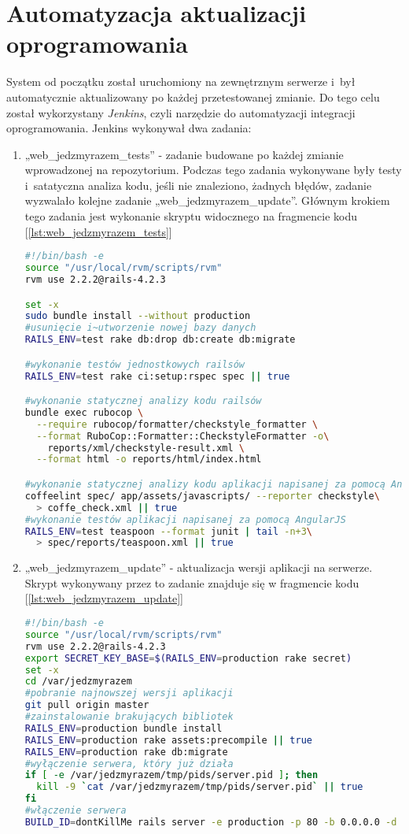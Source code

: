 \documentclass[eng,archivemode]{mgr}
\begin{document}
\section{Automatyzacja aktualizacji oprogramowania}
System od początku został uruchomiony na zewnętrznym serwerze i~był automatycznie aktualizowany po każdej przetestowanej zmianie. Do tego celu został wykorzystany \textit{Jenkins}, czyli narzędzie do automatyzacji integracji oprogramowania. Jenkins wykonywał dwa zadania:
\begin{enumerate}
	\item „web\_jedzmyrazem\_tests” - zadanie budowane po każdej zmianie wprowadzonej na repozytorium. Podczas tego zadania wykonywane były testy i~satatyczna analiza kodu, jeśli nie znaleziono, żadnych błędów, zadanie wyzwalało kolejne zadanie „web\_jedzmyrazem\_update”. Głównym krokiem tego zadania jest wykonanie skryptu widocznego na fragmencie kodu [\ref{lst:web_jedzmyrazem_tests}]
\begin{lstlisting}[language=bash, caption={Skrypt do wykonywania testów aplikacji}, label=lst:web_jedzmyrazem_tests]
#!/bin/bash -e
source "/usr/local/rvm/scripts/rvm"
rvm use 2.2.2@rails-4.2.3

set -x
sudo bundle install --without production
#usunięcie i~utworzenie nowej bazy danych
RAILS_ENV=test rake db:drop db:create db:migrate

#wykonanie testów jednostkowych railsów
RAILS_ENV=test rake ci:setup:rspec spec || true

#wykonanie statycznej analizy kodu railsów
bundle exec rubocop \
  --require rubocop/formatter/checkstyle_formatter \
  --format RuboCop::Formatter::CheckstyleFormatter -o\
    reports/xml/checkstyle-result.xml \
  --format html -o reports/html/index.html

#wykonanie statycznej analizy kodu aplikacji napisanej za pomocą AngularJS
coffeelint spec/ app/assets/javascripts/ --reporter checkstyle\
  > coffe_check.xml || true
#wykonanie testów aplikacji napisanej za pomocą AngularJS
RAILS_ENV=test teaspoon --format junit | tail -n+3\
  > spec/reports/teaspoon.xml || true
\end{lstlisting}
\newpage
	\item „web\_jedzmyrazem\_update” - aktualizacja wersji aplikacji na serwerze. Skrypt wykonywany przez to zadanie znajduje się w fragmencie kodu [\ref{lst:web_jedzmyrazem_update}]
\begin{lstlisting}[language=bash, caption={Skrypt do aktualizacji aplikacji na serwerze}, label=lst:web_jedzmyrazem_update]
#!/bin/bash -e
source "/usr/local/rvm/scripts/rvm"
rvm use 2.2.2@rails-4.2.3
export SECRET_KEY_BASE=$(RAILS_ENV=production rake secret)
set -x
cd /var/jedzmyrazem
#pobranie najnowszej wersji aplikacji
git pull origin master
#zainstalowanie brakujących bibliotek
RAILS_ENV=production bundle install
RAILS_ENV=production rake assets:precompile || true
RAILS_ENV=production rake db:migrate
#wyłączenie serwera, który już działa
if [ -e /var/jedzmyrazem/tmp/pids/server.pid ]; then
  kill -9 `cat /var/jedzmyrazem/tmp/pids/server.pid` || true
fi
#włączenie serwera
BUILD_ID=dontKillMe rails server -e production -p 80 -b 0.0.0.0 -d
\end{lstlisting}
\end{enumerate}
\end{document}
